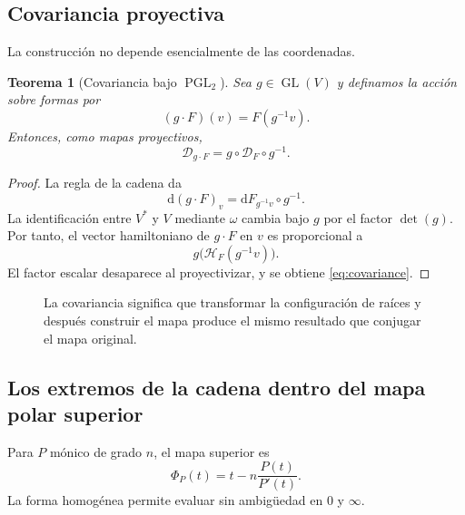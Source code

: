 \documentclass[11pt,oneside]{scrartcl}
\theoremstyle{plainblue}
\newtheorem{theorem}{Teorema}[section]
\theoremstyle{definitionblue}
\theoremstyle{remarkgray}
\newcommand{\PP}{\mathbb{P}}
\newcommand{\dd}{\mathrm{d}}
\newcommand{\PGL}{\operatorname{PGL}}
\newcommand{\GL}{\operatorname{GL}}
\newcommand{\cD}{\mathcal{D}}
\newcommand{\cH}{\mathcal{H}}
\begin{document}
\subsection{Covariancia proyectiva}

La construcción no depende esencialmente de las coordenadas.

\begin{theorem}[Covariancia bajo \(\PGL_2\)]\label{thm:covariance}
Sea \(g\in\GL(V)\) y definamos la acción sobre formas por
\[
(g\cdot F)(v)=F(g^{-1}v).
\]
Entonces, como mapas proyectivos,
\begin{equation}\label{eq:covariance}
\boxed{
\cD_{g\cdot F}=g\circ\cD_F\circ g^{-1}.}
\end{equation}
\end{theorem}

\begin{proof}
La regla de la cadena da
\[
\dd(g\cdot F)_v=\dd F_{g^{-1}v}\circ g^{-1}.
\]
La identificación entre \(V^*\) y \(V\) mediante \(\omega\) cambia bajo \(g\) por el
factor \(\det(g)\). Por tanto, el vector hamiltoniano de \(g\cdot F\) en \(v\) es
proporcional a
\[
g\bigl(\cH_F(g^{-1}v)\bigr).
\]
El factor escalar desaparece al proyectivizar, y se obtiene \cref{eq:covariance}.
\end{proof}

\begin{figure}[ht]
\centering
{}
\caption{La covariancia significa que transformar la configuración de raíces y después construir el mapa produce el mismo resultado que conjugar el mapa original.}
\label{fig:covariance}
\end{figure}

\subsection{Los extremos de la cadena dentro del mapa polar superior}

Para \(P\) mónico de grado \(n\), el mapa superior es
\begin{equation}\label{eq:PhiP}
\Phi_P(t)=t-n\frac{P(t)}{P'(t)}.
\end{equation}
La forma homogénea permite evaluar sin ambigüedad en \(0\) y \(\infty\).
\end{document}
